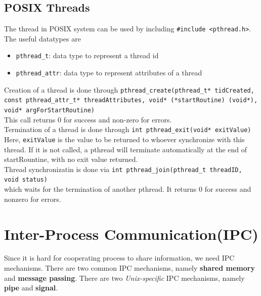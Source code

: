 \documentclass[11pt]{article}
\theoremstyle{definition}
\begin{document}
\subsection{POSIX Threads}
The thread in POSIX system can be used by including \texttt{\#include <pthread.h>}. The useful datatypes are
\begin{itemize}[itemsep=0pt]
  \item \texttt{pthread\_t}: data type to represent a thread id
  \item \texttt{pthread\_attr}: data type to represent attributes of a thread
\end{itemize}
Creation of a thread is done through
\texttt{pthread\_create(pthread\_t* tidCreated, const pthread\_attr\_t* threadAttributes, void* (*startRoutine) (void*), void* argForStartRoutine)}\\
This call returns $0$ for success and non-zero for errors.\\
Termination of a thread is done through
\texttt{int pthread\_exit(void* exitValue)}\\
Here, \texttt{exitValue} is the value to be returned to whoever synchronize with this thread. If it is not called, a pthread will terminate automatically at the end of startRountine, with no exit value returned.\\

Thread synchronizatin is done via
\texttt{int pthread\_join(pthread\_t threadID, void \*\*status)}\\
which waits for the termination of another pthread. It returns $0$ for success and nonzero for errors.
\section{Inter-Process Communication(IPC)}
Since it is hard for cooperating process to share information, we need IPC mechanisms. There are two common IPC mechanisms, namely \textbf{shared memory} and \textbf{message passing}. There are two \textit{Unix-specific} IPC mechanisms, namely \textbf{pipe} and \textbf{signal}.
\end{document}
